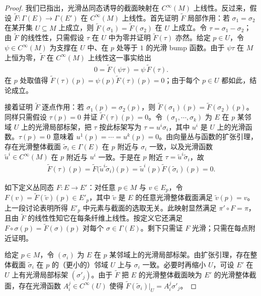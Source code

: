 \documentclass[../../main.tex]{subfiles}
\begin{document}
\begin{proof}
我们已指出，光滑丛同态诱导的截面映射在 $C^\infty(M)$ 上线性。反过来，假设 $\widetilde F\colon\Gamma(E)\to\Gamma(E')$ 在 $C^\infty(M)$ 上线性。首先证明 $\widetilde F$ 局部作用：若 $\sigma_1=\sigma_2$ 在某开集 $U\subseteq M$ 上成立，则 $\widetilde F(\sigma_1)=\widetilde F(\sigma_2)$ 在 $U$ 上成立。令 $\tau=\sigma_1-\sigma_2$；由 $\widetilde F$ 的线性性，只需假设 $\tau$ 在 $U$ 中为零并证明 $\widetilde F(\tau)$ 亦然。给定 $p\in U$，令 $\psi\in C^\infty(M)$ 为支撑在 $U$ 中、在 $p$ 处等于 $1$ 的光滑 bump 函数。由于 $\psi\tau$ 在 $M$ 上恒为零，$\widetilde F$ 在 $C^\infty(M)$ 上线性这一事实给出
\begin{align*}
0=\widetilde F(\psi\tau)=\psi\,\widetilde F(\tau).
\end{align*}
在 $p$ 处取值得 $\widetilde F(\tau)(p)=\psi(p)\widetilde F(\tau)(p)=0$；由于每个 $p\in U$ 都如此，结论成立。

接着证明 $\widetilde F$ 逐点作用：若 $\sigma_1(p)=\sigma_2(p)$，则 $\widetilde F(\sigma_1)(p)=\widetilde F(\sigma_2)(p)$。同样只需假设 $\tau(p)=0$ 并证 $\widetilde F(\tau)(p)=0$。令 $(\sigma_1,\cdots ,\sigma_k)$ 为 $E$ 在 $p$ 某邻域 $U$ 上的光滑局部标架，把 $\tau$ 按此标架写为 $\tau=u^i\sigma_i$，其中 $u^i$ 是 $U$ 上的光滑函数。$\tau(p)=0$ 意味着 $u^1(p)=\cdots=u^k(p)=0$。由向量丛与函数的扩张引理，存在光滑整体截面 $\widetilde\sigma_i\in\Gamma(E)$ 在 $p$ 附近与 $\sigma_i$ 一致，以及光滑函数 $\widetilde u^i\in C^\infty(M)$ 在 $p$ 附近与 $u^i$ 一致。于是在 $p$ 附近 $\tau=\widetilde u^i\widetilde\sigma_i$，故
\begin{align*}
\widetilde F(\tau)(p)=\widetilde F\big(\widetilde u^i\widetilde\sigma_i\big)(p)=\widetilde u^i(p)\widetilde F(\widetilde\sigma_i)(p)=0.
\end{align*}

如下定义丛同态 $F\colon E\to E'$：对任意 $p\in M$ 与 $v\in E_p$，令 $F(v)=\widetilde F(\widetilde v)(p)\in E'_p$，其中 $\widetilde v$ 是 $E$ 的任意光滑整体截面满足 $\widetilde v(p)=v$。上一段讨论表明所得 $E'_p$ 中元素与截面的选取无关。此映射显然满足 $\pi'\circ F=\pi$，且由 $\widetilde F$ 的线性性知它在每条纤维上线性。按定义它还满足 $F\circ\sigma(p)=\widetilde F(\sigma)(p)$ 对每个 $\sigma\in\Gamma(E)$。剩下只需证 $F$ 光滑；只需在每点附近证明。

给定 $p\in M$，令 $(\sigma_i)$ 为 $E$ 在 $p$ 某邻域上的光滑局部标架。由扩张引理，存在整体截面 $\widetilde\sigma_i$ 在 $p$ 的（更小的）邻域 $U$ 上与 $\sigma_i$ 一致。必要时再缩小 $U$，可设 $E'$ 在 $U$ 上有光滑局部标架 $(\sigma'_j)$。由于 $\widetilde F$ 把 $E$ 的光滑整体截面映为 $E'$ 的光滑整体截面，存在光滑函数 $A_i^j\in C^\infty(U)$ 使得 $\widetilde F(\widetilde\sigma_i)|_U=A_i^j\sigma'_j$。


\end{proof}
\end{document}
